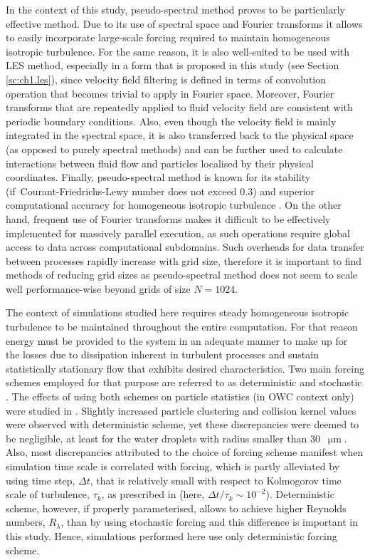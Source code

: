 \documentclass{pracamgren}
\begin{document}
In the context of this study, pseudo-spectral method proves to be particularly effective method.
Due to its use of spectral space and Fourier transforms it allows to easily incorporate large-scale forcing required to maintain homogeneous isotropic turbulence.
For the same reason, it is also well-suited to be used with LES method, especially in a form that is proposed in this study (see Section \ref{sc:ch1.les}), since velocity field filtering is defined in terms of convolution operation that becomes trivial to apply in Fourier space.
Moreover, Fourier transforms that are repeatedly applied to fluid velocity field are consistent with periodic boundary conditions.
Also, even though the velocity field is mainly integrated in the spectral space, it is also transferred back to the physical space (as opposed to purely spectral methods) and can be further used to calculate interactions between fluid flow and particles localised by their physical coordinates.
Finally, pseudo-spectral method is known for its stability (if~Courant-Friedrichs-Lewy number does not exceed 0.3) and superior computational accuracy for homogeneous isotropic turbulence \parencite{Peng2009}.
On the other hand, frequent use of Fourier transforms makes it difficult to be effectively implemented for massively parallel execution, as such operations require global access to data across computational subdomains.
Such overheads for data transfer between processes rapidly increase with grid size, therefore it is important to find methods of reducing grid sizes as pseudo-spectral method does not seem to scale well performance-wise beyond grids of size $N=1024$.

\medskip

The context of simulations studied here requires steady homogeneous isotropic turbulence to be maintained throughout the entire computation.
For that reason energy must be provided to the system in an adequate manner to make up for the losses due to dissipation inherent in  turbulent processes and sustain statistically stationary flow that exhibits desired characteristics.
Two main forcing schemes employed for that purpose are referred to as deterministic \parencite{Sullivan1994} and stochastic \parencite{Eswaran1988}. 
The effects of using both schemes on particle statistics (in OWC context only) were studied in \textcite{Rosa2011,Rosa2013,Rosa2015,Parishani2015}.
Slightly increased particle clustering and collision kernel values were observed with deterministic scheme, yet these discrepancies were deemed to be negligible, at least for the water droplets with radius smaller than $30$~$\upmu\text{m}$.
Also, most discrepancies attributed to the choice of forcing scheme manifest when simulation time scale is correlated with forcing, which is partly alleviated by using time step, $\Delta t$, that is relatively small with respect to Kolmogorov time scale of turbulence, $\tau_k$, as prescribed in \textcite{Rosa2015} (here, $\Delta t / \tau_k \sim 10^{-2}$).
Deterministic scheme, however, if properly parameterised, allows to achieve higher Reynolds numbers, $R_{\lambda}$, than by using stochastic forcing and this difference is important in this study.
Hence, simulations performed here use only deterministic forcing scheme.
\end{document}
